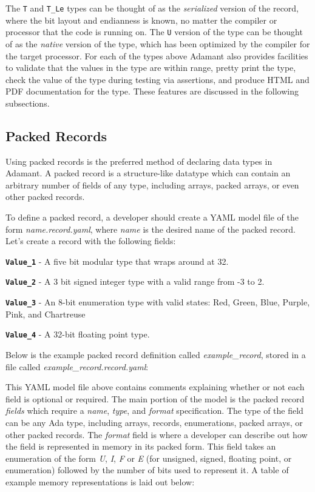 The \texttt{T} and \texttt{T\_Le} types can be thought of as the \textit{serialized} version of the record, where the bit layout and endianness is known, no matter the compiler or processor that the code is running on. The \texttt{U} version of the type can be thought of as the \textit{native} version of the type, which has been optimized by the compiler for the target processor. For each of the types above Adamant also provides facilities to validate that the values in the type are within range, pretty print the type, check the value of the type during testing via assertions, and produce HTML and PDF documentation for the type. These features are discussed in the following subsections.

\subsection{Packed Records} \label{Packed Records}

Using packed records is the preferred method of declaring data types in Adamant. A packed record is a structure-like datatype which can contain an arbitrary number of fields of any type, including arrays, packed arrays, or even other packed records.

To define a packed record, a developer should create a YAML model file of the form \textit{name.record.yaml}, where \textit{name} is the desired name of the packed record. Let's create a record with the following fields:

\begin{spaceditemize}
  \item \textbf{\texttt{Value\_1}} - A five bit modular type that wraps around at 32.
  \item \textbf{\texttt{Value\_2}} - A 3 bit signed integer type with a valid range from -3 to 2.
  \item \textbf{\texttt{Value\_3}} - An 8-bit enumeration type with valid states: Red, Green, Blue, Purple, Pink, and Chartreuse
  \item \textbf{\texttt{Value\_4}} - A 32-bit floating point type.
\end{spaceditemize}

Below is the example packed record definition called \textit{example\_record}, stored in a file called \textit{example\_record.record.yaml}:


This YAML model file above contains comments explaining whether or not each field is optional or required. The main portion of the model is the packed record \textit{fields} which require a \textit{name}, \textit{type}, and \textit{format} specification. The type of the field can be any Ada type, including arrays, records, enumerations, packed arrays, or other packed records. The \textit{format} field is where a developer can describe out how the field is represented in memory in its packed form. This field takes an enumeration of the form \textit{U}, \textit{I}, \textit{F} or \textit{E} (for unsigned, signed, floating point, or enumeration) followed by the number of bits used to represent it. A table of example memory representations is laid out below:

